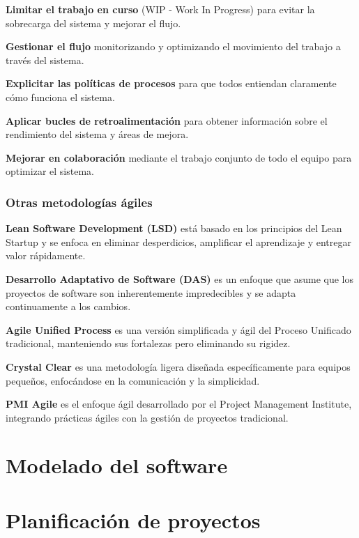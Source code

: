 \documentclass[a4paper,11pt]{report}
\begin{document}
\textbf{Limitar el trabajo en curso} (WIP - Work In Progress) para evitar la sobrecarga del sistema y mejorar el flujo.

\textbf{Gestionar el flujo} monitorizando y optimizando el movimiento del trabajo a través del sistema.

\textbf{Explicitar las políticas de procesos} para que todos entiendan claramente cómo funciona el sistema.

\textbf{Aplicar bucles de retroalimentación} para obtener información sobre el rendimiento del sistema y áreas de mejora.

\textbf{Mejorar en colaboración} mediante el trabajo conjunto de todo el equipo para optimizar el sistema.


\subsection{Otras metodologías ágiles}

\textbf{Lean Software Development (LSD)} está basado en los principios del Lean Startup y se enfoca en eliminar desperdicios, amplificar el aprendizaje y entregar valor rápidamente.

\textbf{Desarrollo Adaptativo de Software (DAS)} es un enfoque que asume que los proyectos de software son inherentemente impredecibles y se adapta continuamente a los cambios.

\textbf{Agile Unified Process} es una versión simplificada y ágil del Proceso Unificado tradicional, manteniendo sus fortalezas pero eliminando su rigidez.

\textbf{Crystal Clear} es una metodología ligera diseñada específicamente para equipos pequeños, enfocándose en la comunicación y la simplicidad.

\textbf{PMI Agile} es el enfoque ágil desarrollado por el Project Management Institute, integrando prácticas ágiles con la gestión de proyectos tradicional.






    \chapter{Modelado del software}\label{ch:modelado-del-software}


    \chapter{Planificación de proyectos}\label{ch:planificacion-de-proyectos}
    
\end{document}

